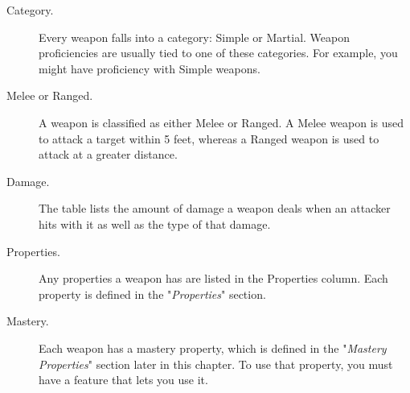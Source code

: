 \documentclass[10pt,a4paper,twoside,bg=print,twocolumn,openany,nodeprecatedcode]{dndbook}
\begin{document}
\begin{description}
\item[Category.]
Every weapon falls into a category: Simple or Martial. Weapon proficiencies are usually tied to one of these categories. For example, you might have proficiency with Simple weapons.
\item[Melee or Ranged.]
A weapon is classified as either Melee or Ranged. A Melee weapon is used to attack a target within 5 feet, whereas a Ranged weapon is used to attack at a greater distance.
\item[Damage.]
The table lists the amount of damage a weapon deals when an attacker hits with it as well as the type of that damage.
\item[Properties.]
Any properties a weapon has are listed in the Properties column. Each property is defined in the "\textit{Properties}" section.
\item[Mastery.]
Each weapon has a mastery property, which is defined in the "\textit{Mastery Properties}" section later in this chapter. To use that property, you must have a feature that lets you use it.
\end{description}
\end{document}
